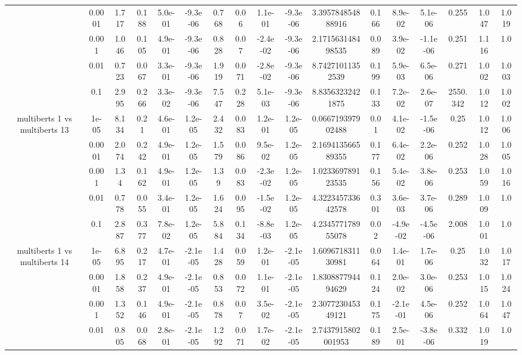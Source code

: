 \begin{tabular}{|c|c|c|c|c|c|c|c|c|c|c|c|c|c|c|c|c|}
 & 0.0001 & 1.717 & 0.188 & 5.0e-01 & -9.3e-06 & 0.768 & 0.06 & 1.1e-01 & -9.3e-06 & 3.395784854888916 & 0.166 & 8.9e-02 & 5.1e-06 & 0.255 & 1.047 & 1.019 \\
 & 0.001 & 1.046 & 0.105 & 4.9e-01 & -9.3e-06 & 0.828 & 0.07 & -2.4e-02 & -9.3e-06 & 2.171563148498535 & 0.089 & 3.9e-02 & -1.1e-06 & 0.251 & 1.116 & 1.0 \\
 & 0.01 & 0.723 & 0.067 & 3.3e-01 & -9.3e-06 & 1.919 & 0.071 & -2.8e-02 & -9.3e-06 & 8.74271011352539 & 0.199 & 5.9e-03 & 6.5e-06 & 0.271 & 1.002 & 1.003 \\
 & 0.1 & 2.995 & 0.266 & 3.3e-02 & -9.3e-06 & 7.547 & 0.228 & 5.1e-03 & -9.3e-06 & 8.83563232421875 & 0.133 & 7.2e-02 & 2.6e-07 & 2550.342 & 1.012 & 1.002 \\
\hline
\multirow{5}{*}{multiberts 1 vs multiberts 13} & 1e-05 & 8.134 & 0.21 & 4.6e-01 & 1.2e-05 & 2.432 & 0.083 & 1.2e-01 & 1.2e-05 & 0.066719397902488 & 0.01 & 4.1e-02 & -1.5e-06 & 0.25 & 1.012 & 1.006 \\
 & 0.0001 & 2.074 & 0.242 & 4.9e-01 & 1.2e-05 & 1.579 & 0.086 & 9.5e-02 & 1.2e-05 & 2.169413566589355 & 0.177 & 6.4e-02 & 2.2e-06 & 0.252 & 1.028 & 1.005 \\
 & 0.001 & 1.34 & 0.162 & 4.9e-01 & 1.2e-05 & 1.39 & 0.083 & -2.3e-02 & 1.2e-05 & 1.023369789123535 & 0.156 & 5.4e-02 & 3.8e-06 & 0.253 & 1.059 & 1.016 \\
 & 0.01 & 0.778 & 0.055 & 3.4e-01 & 1.2e-05 & 1.624 & 0.095 & -1.5e-02 & 1.2e-05 & 4.322345733642578 & 0.301 & 3.6e-03 & 3.7e-06 & 0.289 & 1.009 & 1.0 \\
 & 0.1 & 2.887 & 0.377 & 7.8e-02 & 1.2e-05 & 5.884 & 0.134 & -8.8e-03 & 1.2e-05 & 4.234577178955078 & 0.02 & -4.9e-02 & -4.5e-06 & 2.008 & 1.001 & 1.0 \\
\hline
\multirow{5}{*}{multiberts 1 vs multiberts 14} & 1e-05 & 6.895 & 0.217 & 4.7e-01 & -2.1e-05 & 1.428 & 0.059 & 1.2e-01 & -2.1e-05 & 1.609671831130981 & 0.064 & 1.4e-01 & 1.7e-06 & 0.25 & 1.032 & 1.017 \\
 & 0.0001 & 1.858 & 0.237 & 4.9e-01 & -2.1e-05 & 0.853 & 0.072 & 1.1e-01 & -2.1e-05 & 1.830887794494629 & 0.124 & 2.0e-02 & 3.0e-06 & 0.253 & 1.015 & 1.024 \\
 & 0.001 & 1.352 & 0.146 & 4.9e-01 & -2.1e-05 & 0.878 & 0.07 & 3.5e-02 & -2.1e-05 & 2.307723045349121 & 0.175 & -2.1e-01 & 4.5e-06 & 0.252 & 1.064 & 1.047 \\
 & 0.01 & 0.805 & 0.068 & 2.8e-01 & -2.1e-05 & 1.292 & 0.071 & 1.7e-02 & -2.1e-05 & 2.7437915802001953 & 0.189 & 2.5e-01 & -3.8e-06 & 0.332 & 1.019 & 1.0 \\

\end{tabular}
